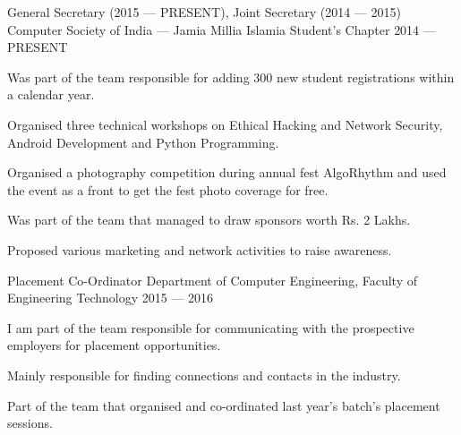 
\begin{cventries}

  \cventry%
    {General Secretary (2015 --- PRESENT), Joint Secretary (2014 --- 2015)} %
    {Computer Society of India --- Jamia Millia Islamia Student's Chapter} %
    {} %
    {2014 --- PRESENT} %
    {%
      \begin{cvitems} %
        \item{Was part of the team responsible for adding 300 new student registrations within a calendar year.}
        \item{Organised three technical workshops on Ethical Hacking and Network Security, Android Development and Python Programming.}
        \item{Organised a photography competition during annual fest AlgoRhythm and used the event as a front to get the fest photo coverage for free.}
        \item{Was part of the team that managed to draw sponsors worth Rs. 2 Lakhs.}
        \item{Proposed various marketing and network activities to raise awareness.}
      \end{cvitems}
    }

  \cventry%
    {Placement Co-Ordinator} %
    {Department of Computer Engineering, Faculty of Engineering Technology} %
    {} %
    {2015 --- 2016} %
    {%
      \begin{cvitems} %
        \item {I am part of the team responsible for communicating with the prospective employers for placement opportunities.}
        \item {Mainly responsible for finding connections and contacts in the industry.}
        \item {Part of the team that organised and co-ordinated last year's batch's placement sessions.}
      \end{cvitems}
    }


\end{cventries}
